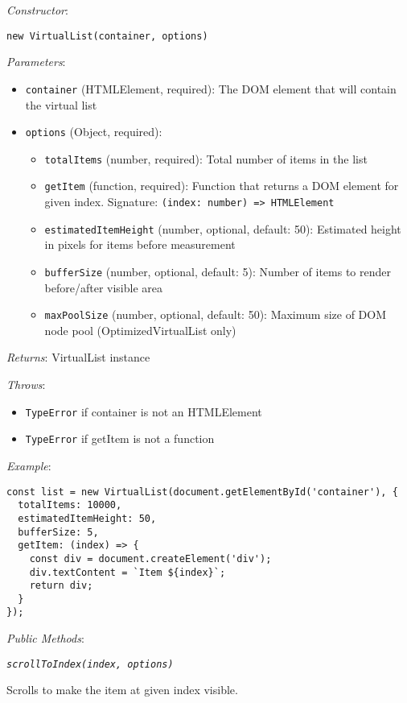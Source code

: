 \documentclass[11pt]{article}
\begin{document}
\emph{Constructor}:

\begin{verbatim}
new VirtualList(container, options)
\end{verbatim}

\emph{Parameters}:
\begin{itemize}
\item \texttt{container} (HTMLElement, required): The DOM element that will contain the virtual list
\item \texttt{options} (Object, required):
\begin{itemize}
\item \texttt{totalItems} (number, required): Total number of items in the list
\item \texttt{getItem} (function, required): Function that returns a DOM element for given index. Signature: \texttt{(index: number) => HTMLElement}
\item \texttt{estimatedItemHeight} (number, optional, default: 50): Estimated height in pixels for items before measurement
\item \texttt{bufferSize} (number, optional, default: 5): Number of items to render before/after visible area
\item \texttt{maxPoolSize} (number, optional, default: 50): Maximum size of DOM node pool (OptimizedVirtualList only)
\end{itemize}
\end{itemize}

\emph{Returns}: VirtualList instance

\emph{Throws}: 
\begin{itemize}
\item \texttt{TypeError} if container is not an HTMLElement
\item \texttt{TypeError} if getItem is not a function
\end{itemize}

\emph{Example}:
\begin{verbatim}
const list = new VirtualList(document.getElementById('container'), {
  totalItems: 10000,
  estimatedItemHeight: 50,
  bufferSize: 5,
  getItem: (index) => {
    const div = document.createElement('div');
    div.textContent = `Item ${index}`;
    return div;
  }
});
\end{verbatim}

\emph{Public Methods}:

\emph{\texttt{scrollToIndex(index, options)}}

Scrolls to make the item at given index visible.
\end{document}
